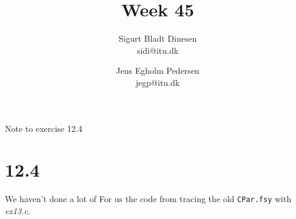 \documentclass[a4paper, titlepage]{article}
\begin{document}
\title{Week 45}
\author{Sigurt Bladt Dinesen \\sidi@itu.dk 
  \and Jens Egholm Pedersen \\jegp@itu.dk}
\maketitle

Note to exercise 12.4
\section*{12.4}
We haven't done a lot of For us the code from tracing the old \texttt{CPar.fsy} with \textit{ex13.c}.
\end{document}
